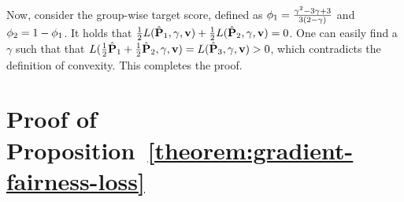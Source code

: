 Now, consider the group-wise target \pagerank score, defined as $\phi_1 = \frac{\gamma^2-3\gamma+3}{3(2-\gamma)}$ and $\phi_2 = 1-\phi_1$. It holds that $\frac{1}{2}L(\hat{\mathbf{{P}}}_1, \gamma, \mathbf{{v}}) + \frac{1}{2}L(\hat{\mathbf{{P}}}_2, \gamma, \mathbf{{v}}) = 0 $. One can easily find a $\gamma$ such that that $L(\frac{1}{2}\hat{\mathbf{{P}}}_1 + \frac{1}{2}\hat{\mathbf{{P}}}_2, \gamma, \mathbf{{v}}) = L(\hat{\mathbf{{P}}}_3, \gamma, \mathbf{{v}}) >0$, which contradicts the definition of convexity. This completes the proof.


\section{Proof of Proposition~\ref{theorem:gradient-fairness-loss}}
\label{appendix:omitted-proposition-proof}

